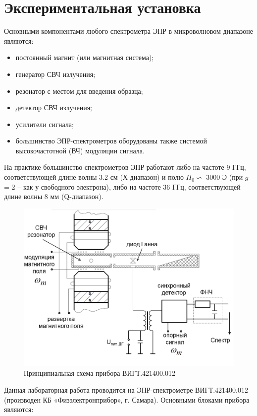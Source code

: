 \documentclass[a4paper,14pt]{article}
\begin{document}
\section{Экспериментальная установка}
Основными компонентами любого спектрометра ЭПР в микроволновом диапазоне являются:
\begin{itemize}
	\item постоянный магнит (или магнитная система);
	\item генератор СВЧ излучения;
	\item резонатор с местом для введения образца;
	\item детектор СВЧ излучения;
	\item усилители сигнала;
	\item большинство ЭПР-спектрометров оборудованы также системой высокочастотной (ВЧ) модуляции сигнала.
\end{itemize}
На практике большинство спектрометров ЭПР работают либо на частоте 9 ГГц, соответствующей длине волны 3.2 см (Х-диапазон) и полю $ H_0 \backsim $ 3000 Э (при $ g $ = 2 – как у свободного электрона), либо на частоте 36 ГГц, соответствующей длине волны 8 мм (Q-диапазон). 
\begin{figure}[h]
	\centering
	\includegraphics{рис4}
	\caption{Принципиальная схема прибора ВИГТ.421400.012}
	\label{fig:4}
\end{figure}
Данная лабораторная работа проводится на ЭПР-спектрометре ВИГТ.421400.012 (производен КБ «Физэлектронприбор», г. Самара). Основными блоками прибора являются:
\end{document}
